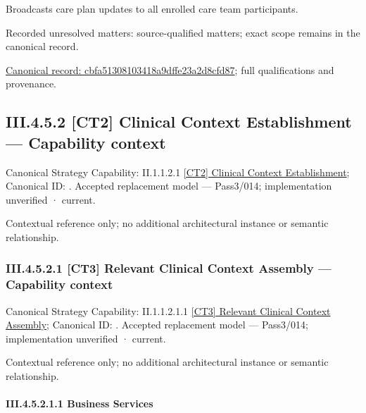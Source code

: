 Broadcasts care plan updates to all enrolled care team participants.


{\small Recorded unresolved matters: source-qualified matters; exact scope remains in the canonical record.}\par
{\footnotesize \href{../../../../continuum/business/business-function/cbfa51308103418a9dffe23a2d8cfd87.md}{Canonical record: cbfa51308103418a9dffe23a2d8cfd87}; full qualifications and provenance.}\par
\subsection*{III.4.5.2 [CT2] Clinical Context Establishment — Capability context}
\label{navigation:III.4.5.2}

{\small Canonical Strategy Capability: II.1.1.2.1 \hyperref[element:7b398aa81bbc43e7a3868e5d85e30a1d]{[CT2] Clinical Context Establishment}; Canonical ID: \texttt{}. Accepted replacement model — Pass3/014; implementation unverified · current.}\par
Contextual reference only; no additional architectural instance or semantic relationship.\par
\subsubsection*{III.4.5.2.1 [CT3] Relevant Clinical Context Assembly — Capability context}
\label{navigation:III.4.5.2.1}

{\small Canonical Strategy Capability: II.1.1.2.1.1 \hyperref[element:32bdf554780d4d6081fc3726fbba11df]{[CT3] Relevant Clinical Context Assembly}; Canonical ID: \texttt{}. Accepted replacement model — Pass3/014; implementation unverified · current.}\par
Contextual reference only; no additional architectural instance or semantic relationship.\par
\paragraph*{III.4.5.2.1.1 Business Services}
\label{navigation:III.4.5.2.1.1}

